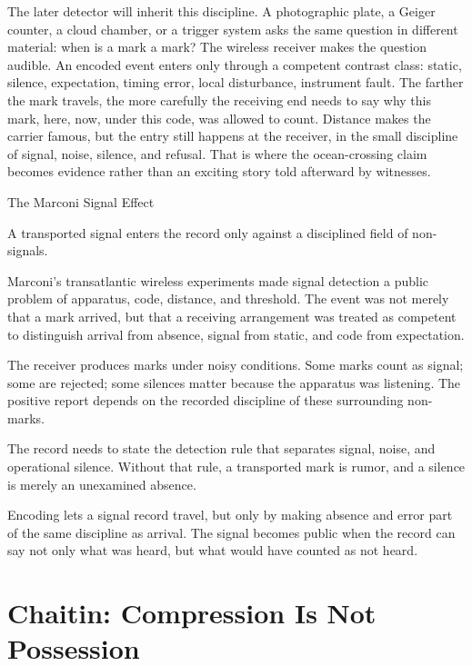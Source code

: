 The later detector will inherit this discipline. A photographic plate, a
Geiger counter, a cloud chamber, or a trigger system asks the same question in
different material: when is a mark a mark? The wireless receiver makes the
question audible. An encoded event enters only through a competent contrast
class: static, silence, expectation, timing error, local disturbance, instrument
fault. The farther the mark travels, the more carefully the receiving end needs
to say why this mark, here, now, under this code, was allowed to count. Distance
makes the carrier famous, but the entry still happens at the receiver, in the
small discipline of signal, noise, silence, and refusal. That is where the
ocean-crossing claim becomes evidence rather than an exciting story told
afterward by witnesses.

\begin{phenom}{The Marconi Signal Effect~\cite{marconi1901}}
\label{ph:marconi-signal}

\PhStatement
A transported signal enters the record only against a disciplined field of
non-signals.

\PhOrigin
Marconi's transatlantic wireless experiments made signal detection a public
problem of apparatus, code, distance, and threshold. The event was not merely
that a mark arrived, but that a receiving arrangement was treated as competent
to distinguish arrival from absence, signal from static, and code from
expectation.

\PhObservation
The receiver produces marks under noisy conditions. Some marks count as signal;
some are rejected; some silences matter because the apparatus was listening.
The positive report depends on the recorded discipline of these surrounding
non-marks.

\PhConstraint
The record needs to state the detection rule that separates signal, noise,
and operational silence. Without that rule, a transported mark is rumor,
and a silence is merely an unexamined absence.

\PhConsequence
Encoding lets a signal record travel, but only by making absence and error
part of the same discipline as arrival. The signal becomes public when the
record can say not only what was heard, but what would have counted as not
heard.
\end{phenom}

\section{Chaitin: Compression Is Not Possession}

